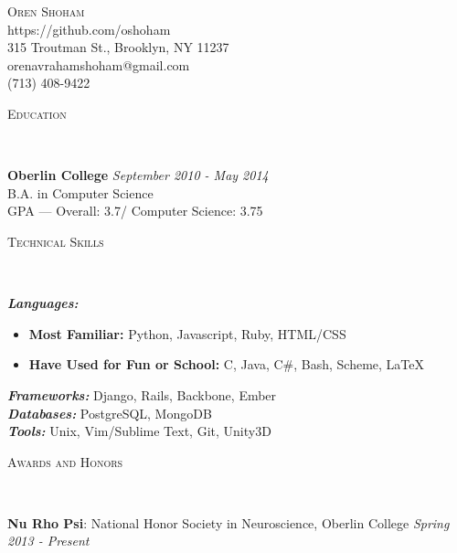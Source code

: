 \documentclass[9pt]{article}
\newenvironment{changemargin}[2]{%
  \begin{list}{}{%
    \setlength{\topsep}{0pt}%
    \setlength{\leftmargin}{#1}%
    \setlength{\rightmargin}{#2}%
    \setlength{\listparindent}{\parindent}%
    \setlength{\itemindent}{\parindent}%
    \setlength{\parsep}{\parskip}%
  }%
  \item[]}{\end{list}
}
\newcommand{\lineover}{
	\begin{changemargin}{-0.05in}{-0.05in}
		\vspace*{-8pt}
		\hrulefill \\
		\vspace*{-2pt}
	\end{changemargin}
}
\newcommand{\header}[1]{
	\begin{changemargin}{-0.5in}{-0.5in}
		\scshape{#1}\\
  	\lineover
	\end{changemargin}
}
\newcommand{\contact}[5]{
	\begin{changemargin}{-0.5in}{-0.5in}
		\begin{center}
			{\Large \scshape {#1}}\\ \smallskip
			{#2}\\ \smallskip 
			{#3}\\ \smallskip
			{#4} \\ \smallskip
			{#5}\smallskip
		\end{center}
	\end{changemargin}
}
\newenvironment{body} {
	\vspace*{-16pt}
	\begin{changemargin}{-0.25in}{-0.5in}
  }	
	{\end{changemargin}
}
\begin{document}

\contact{Oren Shoham}{https://github.com/oshoham}{315 Troutman St., Brooklyn, NY 11237}{orenavrahamshoham@gmail.com}{(713) 408-9422}


\header{Education}

\begin{body}
	\vspace{14pt}
	\textbf{Oberlin College}{} \hfill \emph{September 2010 - May 2014}{} \\
	B.A. in Computer Science \\
	GPA --- Overall: 3.7/ Computer Science: 3.75 \\
\end{body}

\smallskip

\header{Technical Skills}

\begin{body}
	\vspace{14pt}
	\emph{\textbf{Languages:}}{} 
		\begin{itemize} \itemsep -0pt  %
			\item \textbf{Most Familiar:} Python, Javascript, Ruby, HTML/CSS
			\item \textbf{Have Used for Fun or School:} C, Java, C\#, Bash, Scheme, \LaTeX \\
		\end{itemize}
	\medskip
	\emph{\textbf{Frameworks:}}{} Django, Rails, Backbone, Ember \\
	\medskip
	\emph{\textbf{Databases:}}{} PostgreSQL, MongoDB \\
	\medskip
	\emph{\textbf{Tools:}}{} Unix, Vim/Sublime Text, Git, Unity3D \\
\end{body}

\smallskip

\header{Awards and Honors}

\begin{body}
	\vspace{14pt}
	\textbf{Nu Rho Psi}: National Honor Society in Neuroscience, Oberlin College \hfill{} \emph{Spring 2013 - Present}\\
	\smallskip
\end{body}
\end{document}
